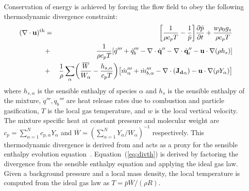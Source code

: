 \documentclass[journal,article,atmosphere,submit,moreauthors,pdftex]{Definitions/mdpi}
\begin{document}
Conservation of energy is achieved by forcing the flow field to obey the following thermodynamic divergence constraint:
\begin{eqnarray}
    ( \nabla \cdot \mathbf{u} )^{\rm th} &=&
    \left[ \frac{1}{\rho c_p T} - \frac{1}{\bar{p}} \right]
    \frac{\partial \bar{p}}{\partial t} + \frac{w \rho_0 g_z}{\rho c_p T} \nonumber \\
    &+& \frac{1}{\rho c_p T} \left[ \dot{q}''' + \dot{q}_b''' - \nabla \cdot \dot{\mathbf{q}}'' - \nabla \cdot \dot{\mathbf{q}}_{\rm r}'' - \mathbf{u} \cdot \nabla (\rho h_s) \right] \nonumber \\
    &+& \frac{1}{\rho} \sum_\alpha \left( \frac{\overline{W}}{W_\alpha} - \frac{h_{s,\alpha}}{c_p T} \right) \left[ \dot{m}_\alpha'''  + \dot{m}_{b,\alpha}''' - \nabla \cdot (\mathbf{J_{d}}_\alpha) - \mathbf{u} \cdot \nabla (\rho Y_\alpha) \right] \label{eq:divth}
\end{eqnarray}
where $h_{s,\alpha}$ is the sensible enthalpy of species $\alpha$ and $h_s$ is the sensible enthalpy of the mixture, $\dot{q}''', \dot{q}_b'''$ are heat release rates due to combustion and particle gasification, $T$ is the local gas temperature, and $w$ is the local vertical velocity. The mixture specific heat at constant pressure and molecular weight are $c_p=\sum_{\alpha =1}^N{c_{p,\alpha} Y_\alpha}$ and $\overline{W}=\left(\sum_{\alpha =1}^N{Y_\alpha /W_\alpha} \right)^{-1}$ respectively. This thermodynamic divergence is derived from and acts as a proxy for the sensible enthalpy evolution equation~\cite{mcdermo_2014}. Equation~(\ref{eq:divth}) is derived by factoring the divergence from the sensible enthalpy equation and applying the ideal gas law.  Given a background pressure and a local mass density, the local temperature is computed from the ideal gas law as $T = \bar{p} \overline{W} / (\rho R) $.
\end{document}

